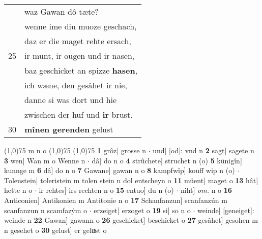 \documentclass[8pt,a4paper,notitlepage]{article}
\begin{document}
\begin{table}[ht]
\begin{minipage}[t]{0.5\linewidth}
\begin{tabular}{rl}
 & waz Gawan dô tæte?\\ 
 & wenne ime diu muoze geschach,\\ 
 & daz er die maget rehte ersach,\\ 
25 & ir munt, ir ougen und ir nasen,\\ 
 & baz geschicket an spizze \textbf{hasen},\\ 
 & ich wæne, den gesâhet ir nie,\\ 
 & danne si was dort und hie\\ 
 & zwischen der huf und \textbf{ir} brust.\\ 
30 & \textbf{mînen gerenden} gelust\\ 
\end{tabular}
\scriptsize
\line(1,0){75} \newline
m n o \newline
\line(1,0){75} \newline
\newline
\line(1,0){75} \newline
\textbf{1} grôz] grosse n  $\cdot$ und] [od]: vnd n \textbf{2} sagt] sagete n \textbf{3} wen] Wan m o Wenne n  $\cdot$ dâ] do n o \textbf{4} strûchete] struchet n (o) \textbf{5} künigîn] kunnge m \textbf{6} dâ] do n o \textbf{7} Gawane] gawan n o \textbf{8} kampfwîp] kouff wip n (o)  $\cdot$ Tolenstein] toleristein m tolen stein n dol entscheyn o \textbf{11} müent] maget o \textbf{13} hât] hette n o  $\cdot$ ir rehtes] irs rechten n o \textbf{15} entuo] du n (o)  $\cdot$ niht] \textit{om.} n o \textbf{16} Anticonien] Antikonien m Antitonie n o \textbf{17} Schanfanzun] scanfanzún m scanfanzun n scamfazẏm o  $\cdot$ erzeiget] erzoget o \textbf{19} si] so n o  $\cdot$ weinde] [geneiget]: weinde n \textbf{22} Gawan] gawann o \textbf{26} geschicket] beschicket o \textbf{27} gesâhet] gesohen m n gesehet o \textbf{30} gelust] er geluͯst o \newline
\end{minipage}
\end{table}
\newpage
\end{document}

